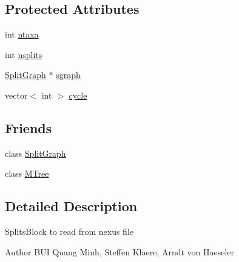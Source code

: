\subsection*{Protected Attributes}
\begin{DoxyCompactItemize}
\item 
int \hyperlink{classMSplitsBlock_abe567d446c6da8b7f31a3ac1e975cf2b}{ntaxa}
\item 
int \hyperlink{classMSplitsBlock_a6cc2af084a4652277e09c85b2feaea37}{nsplits}
\item 
\hyperlink{classSplitGraph}{SplitGraph} $\ast$ \hyperlink{classMSplitsBlock_a6b5251e50f2faf8c1ae161d2c76ca266}{sgraph}
\item 
vector$<$ int $>$ \hyperlink{classMSplitsBlock_a243b83ab3a6a5c3206da496475765d9d}{cycle}
\end{DoxyCompactItemize}
\subsection*{Friends}
\begin{DoxyCompactItemize}
\item 
\hypertarget{classMSplitsBlock_ab8ea3e9164803ba3b6b59fab949bd0f3}{
class \hyperlink{classMSplitsBlock_ab8ea3e9164803ba3b6b59fab949bd0f3}{SplitGraph}}
\label{classMSplitsBlock_ab8ea3e9164803ba3b6b59fab949bd0f3}

\item 
\hypertarget{classMSplitsBlock_a7a747beac427dfc013c53501e474d452}{
class \hyperlink{classMSplitsBlock_a7a747beac427dfc013c53501e474d452}{MTree}}
\label{classMSplitsBlock_a7a747beac427dfc013c53501e474d452}

\end{DoxyCompactItemize}


\subsection{Detailed Description}
SplitsBlock to read from nexus file

\begin{DoxyAuthor}{Author}
BUI Quang Minh, Steffen Klaere, Arndt von Haeseler 
\end{DoxyAuthor}


